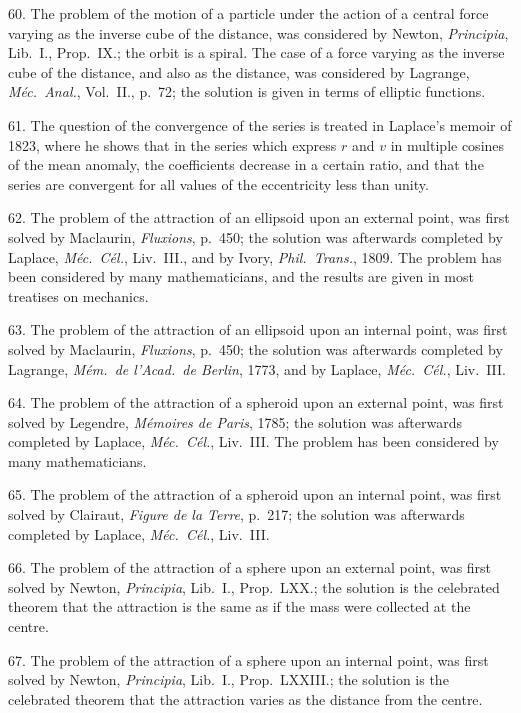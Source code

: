 \documentclass[11pt,a4paper]{book}
\begin{document}
60. The problem of the motion of a particle under the action of a central force varying as the inverse cube of the distance, was considered by Newton, \textit{Principia}, Lib.~I., Prop.~IX.; the orbit is a spiral. The case of a force varying as the inverse cube of the distance, and also as the distance, was considered by Lagrange, \textit{M\'ec.\ Anal.}, Vol.~II., p.~72; the solution is given in terms of elliptic functions.

61. The question of the convergence of the series is treated in Laplace's memoir of 1823, where he shows that in the series which express $r$ and $v$ in multiple cosines of the mean anomaly, the coefficients decrease in a certain ratio, and that the series are convergent for all values of the eccentricity less than unity.

62. The problem of the attraction of an ellipsoid upon an external point, was first solved by Maclaurin, \textit{Fluxions}, p.~450; the solution was afterwards completed by Laplace, \textit{M\'ec.\ C\'el.}, Liv.~III., and by Ivory, \textit{Phil.\ Trans.}, 1809. The problem has been considered by many mathematicians, and the results are given in most treatises on mechanics.

63. The problem of the attraction of an ellipsoid upon an internal point, was first solved by Maclaurin, \textit{Fluxions}, p.~450; the solution was afterwards completed by Lagrange, \textit{M\'em.\ de l'Acad.\ de Berlin}, 1773, and by Laplace, \textit{M\'ec.\ C\'el.}, Liv.~III.

\newpage
\setcounter{page}{530}

64. The problem of the attraction of a spheroid upon an external point, was first solved by Legendre, \textit{M\'emoires de Paris}, 1785; the solution was afterwards completed by Laplace, \textit{M\'ec.\ C\'el.}, Liv.~III. The problem has been considered by many mathematicians.

65. The problem of the attraction of a spheroid upon an internal point, was first solved by Clairaut, \textit{Figure de la Terre}, p.~217; the solution was afterwards completed by Laplace, \textit{M\'ec.\ C\'el.}, Liv.~III.

66. The problem of the attraction of a sphere upon an external point, was first solved by Newton, \textit{Principia}, Lib.~I., Prop.~LXX.; the solution is the celebrated theorem that the attraction is the same as if the mass were collected at the centre.

67. The problem of the attraction of a sphere upon an internal point, was first solved by Newton, \textit{Principia}, Lib.~I., Prop.~LXXIII.; the solution is the celebrated theorem that the attraction varies as the distance from the centre.
\end{document}
